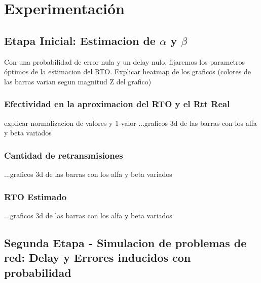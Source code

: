\section{Experimentaci\'on}
\subsection{Etapa Inicial: Estimacion de $\alpha$ y $\beta$}
Con una probabilidad de error nula y un delay nulo, fijaremos los parametros \'optimos de la estimacion del RTO.
Explicar heatmap de los graficos (colores de las barras varian segun magnitud Z del grafico)

\subsubsection{Efectividad en la aproximacion del RTO y el Rtt Real}
	explicar normalizacion de valores y 1-valor
	...graficos 3d de las barras con los alfa y beta variados

\subsubsection{Cantidad de retransmisiones}
	...graficos 3d de las barras con los alfa y beta variados

\subsubsection{RTO Estimado}
	...graficos 3d de las barras con los alfa y beta variados

\subsection{Segunda Etapa - Simulacion de problemas de red: Delay y Errores inducidos con probabilidad}